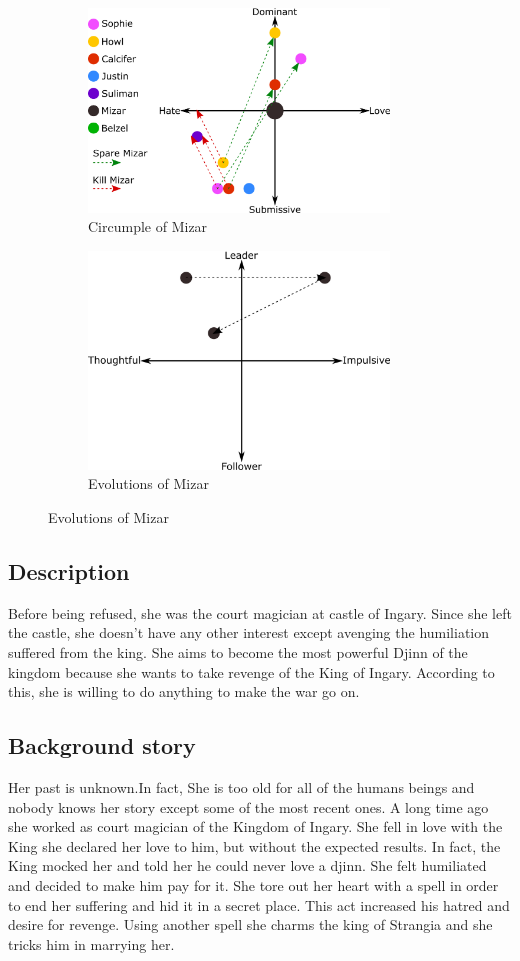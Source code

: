 \begin{figure}
\centering
\begin{subfigure}
  \centering
  \includegraphics[width=8cm]{Images/Circumplexes/mizarCircumplex}
  \caption{Circumple of Mizar}
\end{subfigure}
\begin{subfigure}
  \centering
   \includegraphics[width=8cm]{Images/Evolutions/mizarEvolution}
  \caption{Evolutions of Mizar}
\end{subfigure}
\end{figure}

\subsection{Description}
Before being refused, she was the court magician at castle of Ingary. Since she left the castle, she doesn't have any other interest except avenging the humiliation suffered from the king.
She aims to become the most powerful Djinn of the kingdom because she wants to take revenge of the King of Ingary. According to this, she is willing to do anything to make the war go on.

\subsection{Background story}
Her past is unknown.In fact, She is too old for all of the humans beings and nobody knows her story except some of the most recent ones. A long time ago she worked as court magician of the Kingdom of Ingary. She fell in love with the King she declared her love to him, but without the expected results. In fact, the King mocked her and told her he could never love a djinn. She felt humiliated and decided to make him pay for it. She tore out her heart with a spell in order to end her suffering and hid it in a secret place. This act increased his hatred and desire for revenge. Using another spell she charms the king of Strangia and she tricks him in marrying her.



